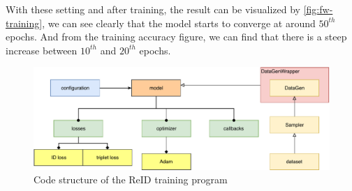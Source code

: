 With these setting and after training, the result can be visualized by
\autoref{fig:fw-training}, we can see clearly that the model starts to converge
at around $50^{th}$ epochs. And from the training accuracy figure, we can find
that there is a steep increase between $10^{th}$ and $20^{th}$ epochs.

\begin{figure}
    \includegraphics[width=\linewidth]{figures/framework_reid_code_overview.pdf}
    \caption{Code structure of the ReID training program}
    \label{fig:fw-reid-code-overview}
\end{figure}

